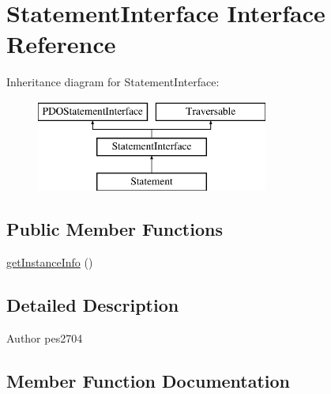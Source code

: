 \hypertarget{interface_pes_1_1_database_1_1_statement_1_1_statement_interface}{}\section{Statement\+Interface Interface Reference}
\label{interface_pes_1_1_database_1_1_statement_1_1_statement_interface}
Inheritance diagram for Statement\+Interface\+:\begin{figure}[H]
\begin{center}
\leavevmode
\includegraphics[height=3.000000cm]{interface_pes_1_1_database_1_1_statement_1_1_statement_interface}
\end{center}
\end{figure}
\subsection*{Public Member Functions}
\begin{DoxyCompactItemize}
\item 
\mbox{\hyperlink{interface_pes_1_1_database_1_1_statement_1_1_statement_interface_ad86fa5498ac1054e414a91fa4a6a7dfd}{get\+Instance\+Info}} ()
\end{DoxyCompactItemize}


\subsection{Detailed Description}
\begin{DoxyAuthor}{Author}
pes2704 
\end{DoxyAuthor}


\subsection{Member Function Documentation}
\mbox{\label{interface_pes_1_1_database_1_1_statement_1_1_statement_interface_ad86fa5498ac1054e414a91fa4a6a7dfd}} 

